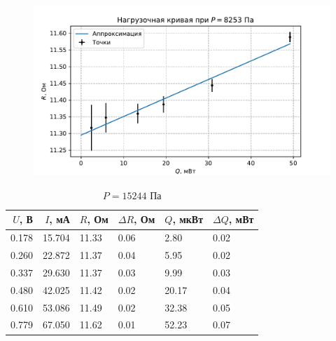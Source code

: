 \begin{figure}[H]\centering\includegraphics[width=\textwidth]{graphs/RQ8252.654613598917.pdf}\end{figure}\begin{table}[H]
\centering
\caption{$P = 15244$ Па}
\begin{tabular}{rrllll}
\hline
 $U$, В &  $I$, мА &     $R$, Ом & $\Delta R$, Ом &     $Q$, мкВт & $\Delta Q$, мВт \\ \hline
0.178 & 15.704 & 11.33 &           0.06 &  2.80 &            0.02 \\ \hline
0.260 & 22.872 & 11.37 &           0.04 &  5.95 &            0.02 \\ \hline
0.337 & 29.630 & 11.37 &           0.03 &  9.99 &            0.03 \\ \hline
0.480 & 42.025 & 11.42 &           0.02 & 20.17 &            0.04 \\ \hline
0.610 & 53.086 & 11.49 &           0.02 & 32.38 &            0.05 \\ \hline
0.779 & 67.050 & 11.62 &           0.01 & 52.23 &            0.07 \\ \hline
\end{tabular}
\end{table}
